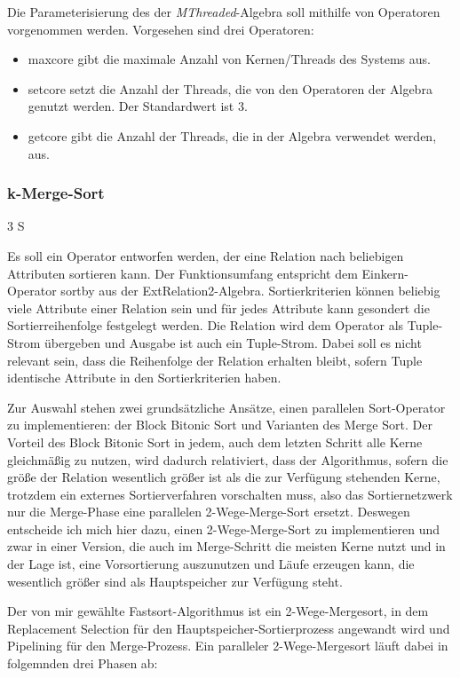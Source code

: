 \documentclass[a4paper,12pt,twoside]{article}
\newcommand{\Fb}[1]{\textit{#1}} %
\begin{document}
Die Parameterisierung des der \Fb{MThreaded}-Algebra soll mithilfe von Operatoren vorgenommen werden. Vorgesehen sind drei Operatoren:

\begin{itemize}
	\item maxcore gibt die maximale Anzahl von Kernen/Threads des Systems aus.
	\item setcore setzt die Anzahl der Threads, die von den Operatoren der Algebra genutzt werden. Der Standardwert ist 3.
	\item getcore gibt die Anzahl der Threads, die in der Algebra verwendet werden, aus.
\end{itemize}

\subsubsection{k-Merge-Sort} 3 S
\label{entw:sort}

Es soll ein Operator entworfen werden, der eine Relation nach beliebigen Attributen sortieren kann. Der Funktionsumfang entspricht dem Einkern-Operator sortby aus der ExtRelation2-Algebra. Sortierkriterien können beliebig viele Attribute einer Relation sein und für jedes Attribute kann gesondert die Sortierreihenfolge festgelegt werden. Die Relation wird dem Operator als Tuple-Strom übergeben und Ausgabe ist auch ein Tuple-Strom. Dabei soll es nicht relevant sein, dass die Reihenfolge der Relation erhalten bleibt, sofern Tuple identische Attribute in den Sortierkriterien haben.

Zur Auswahl stehen zwei grundsätzliche Ansätze, einen parallelen Sort-Operator zu implementieren: der Block Bitonic Sort und Varianten des Merge Sort. Der Vorteil des Block Bitonic Sort in jedem, auch dem letzten Schritt alle Kerne gleichmäßig zu nutzen, wird dadurch relativiert, dass der Algorithmus, sofern die größe der Relation wesentlich größer ist als die zur Verfügung stehenden Kerne, trotzdem ein externes Sortierverfahren vorschalten muss, also das Sortiernetzwerk nur die Merge-Phase eine parallelen 2-Wege-Merge-Sort ersetzt. Deswegen entscheide ich mich hier dazu, einen 2-Wege-Merge-Sort zu implementieren und zwar in einer Version, die auch im Merge-Schritt die meisten Kerne nutzt und in der Lage ist, eine Vorsortierung auszunutzen und Läufe erzeugen kann, die wesentlich größer sind als Hauptspeicher zur Verfügung steht.

Der von mir gewählte Fastsort-Algorithmus ist ein 2-Wege-Mergesort, in dem Replacement Selection für den Hauptspeicher-Sortierprozess angewandt wird und Pipelining für den Merge-Prozess. Ein paralleler 2-Wege-Mergesort läuft dabei in folgemnden drei Phasen ab:
\end{document}
